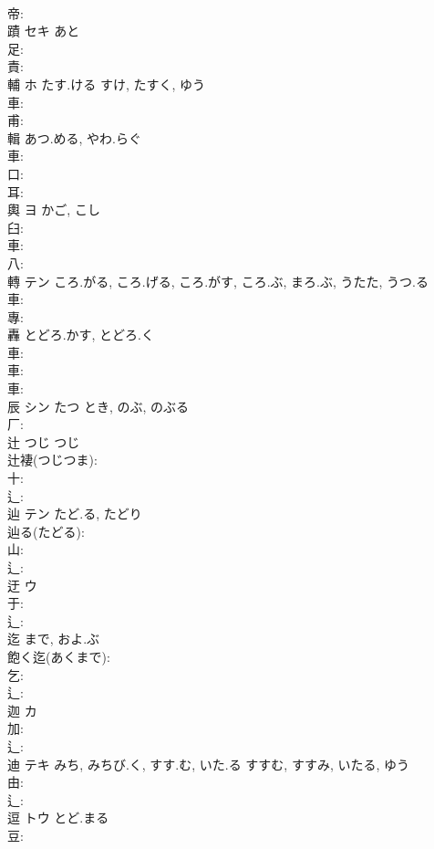 \documentclass[8pt]{extreport}
\begin{document}
\begin{CJK}{UTF8}{min}
\\	帝: 
\\	蹟	セキ	あと		
\\	足: 
\\	責: 
\\	輔	ホ	たす.ける	すけ, たすく, ゆう	
\\	車: 
\\	甫: 
\\	輯		あつ.める, やわ.らぐ			
\\	車: 
\\	口: 
\\	耳: 
\\	輿	ヨ	かご, こし		
\\	臼: 
\\	車: 
\\	八: 
\\	轉	テン	ころ.がる, ころ.げる, ころ.がす, ころ.ぶ, まろ.ぶ, うたた, うつ.る				
\\	車: 
\\	專: 
\\	轟		とどろ.かす, とどろ.く			
\\	車: 
\\	車: 
\\	車: 
\\	辰	シン	たつ	とき, のぶ, のぶる	
\\	厂: 
\\	辻	つじ	つじ		
\\	辻褄(つじつま): 
\\	十: 
\\	辶: 
\\	辿	テン	たど.る, たどり		
\\	辿る(たどる): 
\\	山: 
\\	辶: 
\\	迂	ウ			
\\	于: 
\\	辶: 
\\	迄		まで, およ.ぶ			
\\	飽く迄(あくまで): 
\\	乞: 
\\	辶: 
\\	迦	カ			
\\	加: 
\\	辶: 
\\	迪	テキ	みち, みちび.く, すす.む, いた.る	すすむ, すすみ, いたる, ゆう	
\\	由: 
\\	辶: 
\\	逗	トウ	とど.まる		
\\	豆: 

\end{CJK}
\end{document}

